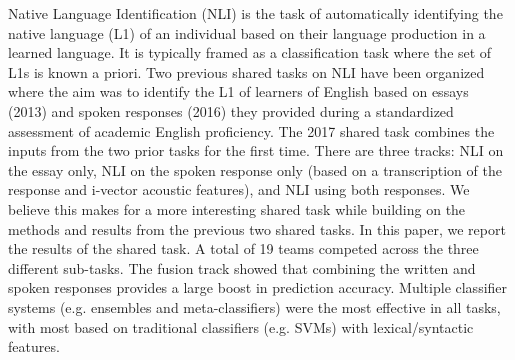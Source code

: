 Native Language Identification (NLI) is the task of automatically identifying the native language (L1) of an individual based on their language production in a learned language. It is typically framed as a classification task where the set of L1s is known a priori. Two previous shared tasks on NLI have been organized where the aim was to identify the L1 of learners of English based on essays (2013) and spoken responses (2016) they provided during a standardized assessment of academic English proficiency. The 2017 shared task combines the inputs from the two prior tasks for the first time. There are three tracks: NLI on the essay only, NLI on the spoken response only (based on a transcription of the response and i-vector acoustic features), and NLI using both responses. We believe this makes for a more interesting shared task while building on the methods and results from the previous two shared tasks. In this paper, we report the results of the shared task. A total of 19 teams competed across the three different sub-tasks. The fusion track showed that combining the written and spoken responses provides a large boost in prediction accuracy. Multiple classifier systems (e.g. ensembles and meta-classifiers) were the most effective in all tasks, with most based on traditional classifiers (e.g. SVMs) with lexical/syntactic features.
